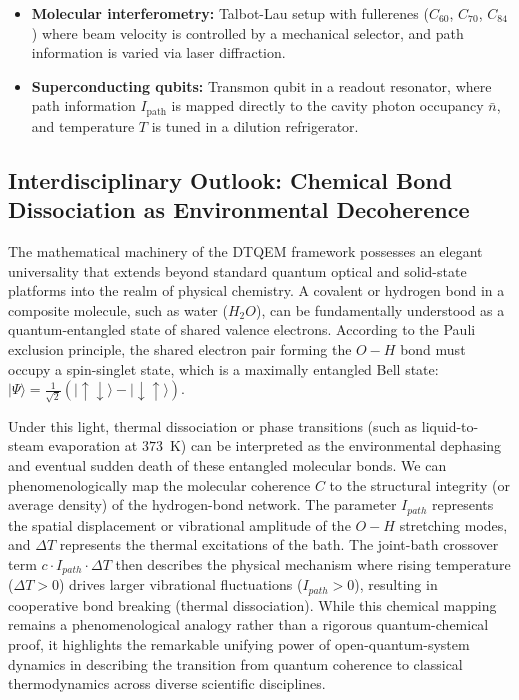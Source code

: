 \documentclass[reprint,amsmath,amssymb,aps,pra,superscriptaddress]{revtex4-2}
\begin{document}
\begin{itemize}
    \item \textbf{Molecular interferometry:} Talbot-Lau setup with fullerenes ($C_{60}$, $C_{70}$, $C_{84}$) where beam velocity is controlled by a mechanical selector, and path information is varied via laser diffraction.
    \item \textbf{Superconducting qubits:} Transmon qubit in a readout resonator, where path information $I_{\text{path}}$ is mapped directly to the cavity photon occupancy $\bar{n}$, and temperature $T$ is tuned in a dilution refrigerator.
\end{itemize}

\subsection{Interdisciplinary Outlook: Chemical Bond Dissociation as Environmental Decoherence}

The mathematical machinery of the DTQEM framework possesses an elegant universality that extends beyond standard quantum optical and solid-state platforms into the realm of physical chemistry. A covalent or hydrogen bond in a composite molecule, such as water ($H_2O$), can be fundamentally understood as a quantum-entangled state of shared valence electrons. According to the Pauli exclusion principle, the shared electron pair forming the $O-H$ bond must occupy a spin-singlet state, which is a maximally entangled Bell state: $|\Psi\rangle = \frac{1}{\sqrt{2}}(|\uparrow\downarrow\rangle - |\downarrow\uparrow\rangle)$.

Under this light, thermal dissociation or phase transitions (such as liquid-to-steam evaporation at $373$~K) can be interpreted as the environmental dephasing and eventual sudden death of these entangled molecular bonds. We can phenomenologically map the molecular coherence $C$ to the structural integrity (or average density) of the hydrogen-bond network. The parameter $I_{path}$ represents the spatial displacement or vibrational amplitude of the $O-H$ stretching modes, and $\Delta T$ represents the thermal excitations of the bath. The joint-bath crossover term $c \cdot I_{path} \cdot \Delta T$ then describes the physical mechanism where rising temperature ($\Delta T > 0$) drives larger vibrational fluctuations ($I_{path} > 0$), resulting in cooperative bond breaking (thermal dissociation). While this chemical mapping remains a phenomenological analogy rather than a rigorous quantum-chemical proof, it highlights the remarkable unifying power of open-quantum-system dynamics in describing the transition from quantum coherence to classical thermodynamics across diverse scientific disciplines.
\end{document}

